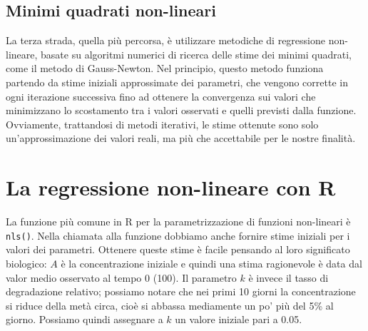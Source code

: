 \documentclass[a4paper,12pt,oneside]{book}
\begin{document}
\hypertarget{minimi-quadrati-non-lineari}{%
\subsection{Minimi quadrati non-lineari}\label{minimi-quadrati-non-lineari}}

La terza strada, quella più percorsa, è utilizzare metodiche di regressione non-lineare, basate su algoritmi numerici di ricerca delle stime dei minimi quadrati, come il metodo di Gauss-Newton. Nel principio, questo metodo funziona partendo da stime iniziali approssimate dei parametri, che vengono corrette in ogni iterazione successiva fino ad ottenere la convergenza sui valori che minimizzano lo scostamento tra i valori osservati e quelli previsti dalla funzione. Ovviamente, trattandosi di metodi iterativi, le stime ottenute sono solo un'approssimazione dei valori reali, ma più che accettabile per le nostre finalità.

\hypertarget{la-regressione-non-lineare-con-r}{%
\section{La regressione non-lineare con R}\label{la-regressione-non-lineare-con-r}}

La funzione più comune in R per la parametrizzazione di funzioni non-lineari è \texttt{nls()}. Nella chiamata alla funzione dobbiamo anche fornire stime iniziali per i valori dei parametri. Ottenere queste stime è facile pensando al loro significato biologico: \(A\) è la concentrazione iniziale e quindi una stima ragionevole è data dal valor medio osservato al tempo 0 (100). Il parametro \(k\) è invece il tasso di degradazione relativo; possiamo notare che nei primi 10 giorni la concentrazione si riduce della metà circa, cioè si abbassa mediamente un po' più del 5\% al giorno. Possiamo quindi assegnare a \(k\) un valore iniziale pari a 0.05.
\end{document}
